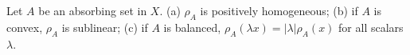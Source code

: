 Let $A$ be an absorbing set in $X$. (a) $\rho_A$ is positively homogeneous; (b) if $A$ is convex, $\rho_A$ is sublinear; (c) if $A$ is balanced, $\rho_A(\lambda x) = |\lambda|\rho_A(x)$ for all scalars $\lambda$.
